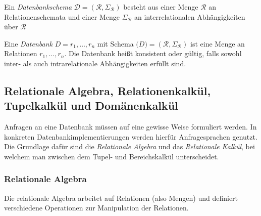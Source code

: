 \documentclass[a4paper,parskip=half*,DIV=15,fontsize=11pt]{scrartcl}
\begin{document}

Ein \textit{Datenbankschema} $\mathcal{D} = (\mathcal{R}, \Sigma_\mathcal{R})$ besteht aus einer Menge $\mathcal{R}$ an Relationenschemata und einer Menge $\Sigma_\mathcal{R}$ an interrelationalen Abhängigkeiten über $\mathcal{R}$

Eine \textit{Datenbank} $D = {r_1, \ldots , r_n}$ mit Schema $\mathcal(D) = (\mathcal{R}, \Sigma_\mathcal{R})$ ist eine Menge an Relationen $r_1, \ldots, r_n$. Die Datenbank heißt konsistent oder gültig, falls sowohl inter- als auch intrarelationale Abhängigkeiten erfüllt sind.


\subsection{Relationale Algebra, Relationenkalkül, Tupelkalkül und Domänenkalkül}
Anfragen an eine Datenbank müssen auf eine gewisse Weise formuliert werden. In konkreten Datenbankimplementierungen werden hierfür Anfragesprachen genutzt. Die Grundlage dafür sind die \textit{Relationale Algebra} und das \textit{Relationale Kalkül}, bei welchem man zwischen dem Tupel- und Bereichskalkül unterscheidet.

\subsubsection{Relationale Algebra}
Die relationale Algebra arbeitet auf Relationen (also Mengen) und definiert verschiedene Operationen zur Manipulation der Relationen.
\end{document}
